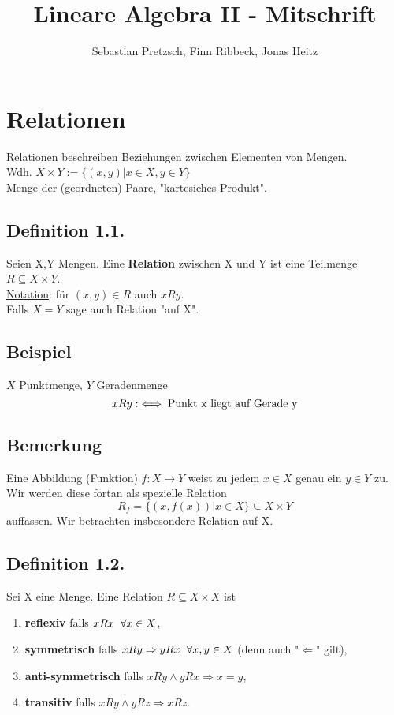 \documentclass {article}
\newcommand{\tn}[1]{\textnormal {#1}}
\begin{document}
\title{Lineare Algebra II - Mitschrift}
\author{Sebastian Pretzsch, Finn Ribbeck, Jonas Heitz}
\maketitle
\section{Relationen}
Relationen beschreiben Beziehungen zwischen Elementen von Mengen. \\
Wdh. $X{\times}Y := \{(x,y) | x \in X, y \in Y\}$ \\
Menge der (geordneten) Paare, "kartesiches Produkt".

\subsection*{Definition 1.1.}
Seien X,Y Mengen. Eine \textbf{Relation} zwischen X und Y ist eine Teilmenge $R \subseteq X{\times}Y$. \\
\underline{Notation}: für $(x,y)\in R$ auch $xRy$. \\
Falls $X=Y$ sage auch Relation "auf X".

\subsection*{Beispiel}
$X$ Punktmenge, $Y$ Geradenmenge
$$xRy :\iff \tn{Punkt x liegt auf Gerade y}$$

\subsection*{Bemerkung}
Eine Abbildung (Funktion) $f:X{\to}Y$ weist zu jedem $x\in X$ genau ein $
y\in Y$ zu. \\
Wir werden diese fortan als spezielle Relation
$$R_f = \{(x, f(x)) | x\in X\} \subseteq X{\times}Y$$
auffassen. Wir betrachten insbesondere Relation auf X.

\subsection*{Definition 1.2.}
Sei X eine Menge. Eine Relation $R \subseteq X{\times}X$ ist
\begin{enumerate}[label=(\alph*)]
\item \textbf{reflexiv} falls $xRx \hspace*{2mm}\forall x\in X$,
\item \textbf{symmetrisch} falls $xRy \Rightarrow yRx \hspace*{2mm}\forall x,y\in X$ (denn auch "$\Leftarrow$" gilt),
\item \textbf{anti-symmetrisch} falls $xRy \land yRx \Rightarrow x=y$,
\item \textbf{transitiv} falls $xRy \land yRz \Rightarrow xRz$.
\end{enumerate}
\end{document}
